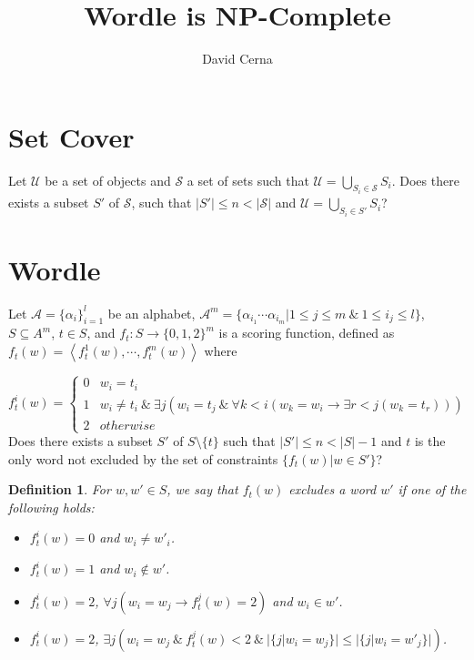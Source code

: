 \documentclass[10pt,a4paper]{article}
\author{David Cerna}
\title{Wordle is NP-Complete}
\newtheorem{definition}{Definition}
\begin{document}
\maketitle
\section{Set Cover}
Let  $\mathcal{U}$ be a set of objects and $\mathcal{S}$ a set of sets such that $\mathcal{U} =\bigcup_{S_i\in \mathcal{S}} S_i$. Does there exists a subset $S'$ of $\mathcal{S}$, such that $\vert S'\vert \leq n< \vert \mathcal{S}\vert$ and 
$\mathcal{U} =\bigcup_{S_i\in S'} S_i$?

\section{Wordle}
Let $\mathcal{A}= \{\alpha_{i}\}^{l}_{i=1}$ be an alphabet, $\mathcal{A}^{m} =\{ \alpha_{i_1}\cdots \alpha_{i_m}\vert 1\leq j\leq m\ \& \ 1\leq i_j\leq l\}$,  $S\subseteq A^m$, $t\in S$, and  $f_t:S\rightarrow \{0,1,2\}^m$ is a scoring function, defined as $f_t(w) = \left\langle f_t^1(w),\cdots, f_t^{m}(w)\right\rangle$ where

$$f_t^i(w) =\left\lbrace \begin{array}{cc}
0 &  w_i = t_i \\
1 & w_i \not = t_i\ \&\ \exists j(w_i = t_j \ \& \ \forall k< i(w_k =w_i \rightarrow \exists r< j (w_k=t_r)))\\
2 & otherwise
\end{array}\right.$$
Does there exists a subset $S'$ of $S\setminus \{t\}$ such that $\vert S'\vert \leq n< \vert S\vert-1 $ and $t$ is the only word not excluded by the set of constraints $\{f_t(w)\vert w\in S'\}$?

\begin{definition}
For $w,w'\in S$, we say that $f_t(w)$ excludes a word $w'$ if one of the following holds: 

\begin{itemize}
\item $f_t^i(w) = 0$ and $w_i\not= w'_i $. 
\item $f_t^i(w) = 1$ and $w_i \not \in w'$.
\item $f_t^i(w) = 2$, $\forall j( w_i = w_j\rightarrow f_t^j(w) = 2)$ and $w_i\in w'$.
\item $f_t^i(w) = 2$,  $\exists j( w_i = w_j \ \&\ f_t^j(w) < 2 \ \& \ \vert\{j\vert w_i=w_j\}\vert\leq \vert\{j\vert w_i=w'_j\}\vert)$.
\end{itemize}
\end{definition}
\end{document}

